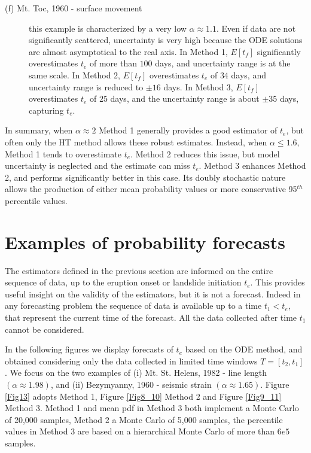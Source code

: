 \documentclass{article}
\begin{document}
\begin{description}
  \item[(f) Mt. Toc, 1960 - surface movement] this example is characterized by a very low $\alpha\approx 1.1$. Even if data are not significantly scattered, uncertainty is very high because the ODE solutions are almost asymptotical to the real axis. In Method 1, $E[t_f]$ significantly overestimates $t_e$ of more than $100$ days, and uncertainty range is at the same scale. In Method 2, $E[t_f]$ overestimates $t_e$ of $34$ days, and uncertainty range is reduced to $\pm 16$ days. In Method 3, $E[t_f]$ overestimates $t_e$ of $25$ days, and the uncertainty range is about $\pm 35$ days, capturing $t_e$.
\end{description}

In summary, when $\alpha\approx 2$ Method 1 generally provides a good estimator of $t_e$, but often only the HT method allows these robust estimates. Instead, when $\alpha \le 1.6$, Method 1 tends to overestimate $t_e$. Method 2 reduces this issue, but model uncertainty is neglected and the estimate can miss $t_e$. Method 3 enhances Method 2, and performs significantly better in this case. Its doubly stochastic nature allows the production of either mean probability values or more conservative 95$^{th}$ percentile values.

\newpage
\section{Examples of probability forecasts}
The estimators defined in the previous section are informed on the entire sequence of data, up to the eruption onset or landslide initiation $t_e$. This provides useful insight on the validity of the estimators, but it is not a forecast. Indeed in any forecasting problem the sequence of data is available up to a time $t_1<t_e$, that represent the current time of the forecast. All the data collected after time $t_1$ cannot be considered.

In the following figures we display forecasts of $t_e$ based on the ODE method, and obtained considering only the data collected in limited time windows $T=[t_2,t_1]$. We focus on the two examples of (i) Mt. St. Helens, 1982 - line length $(\alpha\approx1.98)$, and (ii) Bezymyanny, 1960 - seismic strain $(\alpha\approx1.65)$. Figure \ref{Fig13} adopts Method 1, Figure \ref{Fig8_10} Method 2 and Figure \ref{Fig9_11} Method 3. Method 1 and mean pdf in Method 3 both implement a Monte Carlo of 20,000 samples, Method 2 a Monte Carlo of 5,000 samples, the percentile values in Method 3 are based on a hierarchical Monte Carlo of more than $6e5$ samples.
\end{document}
